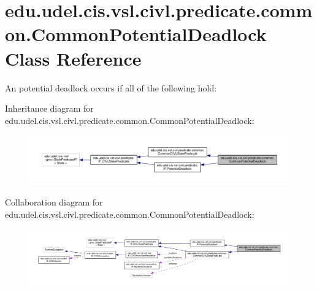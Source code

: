 \hypertarget{classedu_1_1udel_1_1cis_1_1vsl_1_1civl_1_1predicate_1_1common_1_1CommonPotentialDeadlock}{}\section{edu.\+udel.\+cis.\+vsl.\+civl.\+predicate.\+common.\+Common\+Potential\+Deadlock Class Reference}
\label{classedu_1_1udel_1_1cis_1_1vsl_1_1civl_1_1predicate_1_1common_1_1CommonPotentialDeadlock}


An potential deadlock occurs if all of the following hold\+:  




Inheritance diagram for edu.\+udel.\+cis.\+vsl.\+civl.\+predicate.\+common.\+Common\+Potential\+Deadlock\+:
\nopagebreak
\begin{figure}[H]
\begin{center}
\leavevmode
\includegraphics[width=350pt]{classedu_1_1udel_1_1cis_1_1vsl_1_1civl_1_1predicate_1_1common_1_1CommonPotentialDeadlock__inherit__graph}
\end{center}
\end{figure}


Collaboration diagram for edu.\+udel.\+cis.\+vsl.\+civl.\+predicate.\+common.\+Common\+Potential\+Deadlock\+:
\nopagebreak
\begin{figure}[H]
\begin{center}
\leavevmode
\includegraphics[width=350pt]{classedu_1_1udel_1_1cis_1_1vsl_1_1civl_1_1predicate_1_1common_1_1CommonPotentialDeadlock__coll__graph}
\end{center}
\end{figure}
